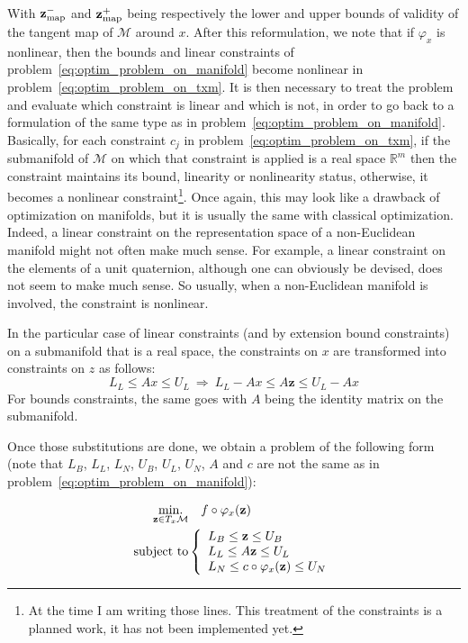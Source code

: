 With ${\bf z}_{\text{map}}^-$ and ${\bf z}_{\text{map}}^+$ being respectively the lower and upper bounds of validity of the tangent map of $\mathcal{M}$ around $x$.
After this reformulation, we note that if $\varphi_x$ is nonlinear, then the bounds and linear constraints of problem~\ref{eq:optim_problem_on_manifold} become nonlinear in problem~\ref{eq:optim_problem_on_txm}.
It is then necessary to treat the problem and evaluate which constraint is linear and which is not, in order to go back to a formulation of the same type as in problem~\ref{eq:optim_problem_on_manifold}.
Basically, for each constraint $c_j$ in problem~\ref{eq:optim_problem_on_txm}, if the submanifold of $\mathcal{M}$ on which that constraint is applied is a real space $\mathbb{R}^m$ then the constraint maintains its bound, linearity or nonlinearity status, otherwise, it becomes a nonlinear constraint\footnote{At the time I am writing those lines. This treatment of the constraints is a planned work, it has not been implemented yet.}.
Once again, this may look like a drawback of optimization on manifolds, but it is usually the same with classical optimization.
Indeed, a linear constraint on the representation space of a non-Euclidean manifold might not often make much sense.
For example, a linear constraint on the elements of a unit quaternion, although one can obviously be devised, does not seem to make much sense.
So usually, when a non-Euclidean manifold is involved, the constraint is nonlinear.

In the particular case of linear constraints (and by extension bound constraints) on a submanifold that is a real space, the constraints on $x$ are transformed into constraints on $z$ as follows:
\begin{equation}
  L_L \leq Ax \leq U_L \ \Rightarrow \ L_L - Ax \leq A\mathbf{z} \leq U_L-Ax
\end{equation}
For bounds constraints, the same goes with $A$ being the identity matrix on the submanifold.

Once those substitutions are done, we obtain a problem of the following form (note that $L_B$, $L_L$, $L_N$, $U_B$, $U_L$, $U_N$, $A$ and $c$ are not the same as in problem~\ref{eq:optim_problem_on_manifold}):

\begin{align}
\label{eq:optim_txm_final}
  \operatorname*{min.}_{\mathbf{z} \in T_x\mathcal{M}} & \quad f \circ \varphi_x(\mathbf{z})\\ \nonumber
  \text{subject to}&\left\{
  \begin{array}{lr}
    L_B \leq \mathbf{z} \leq U_B \\
    L_L \leq A \mathbf{z} \leq U_L \\
    L_N \leq c \circ \varphi_x(\mathbf{z}) \leq U_N
  \end{array}\right.
\end{align}

